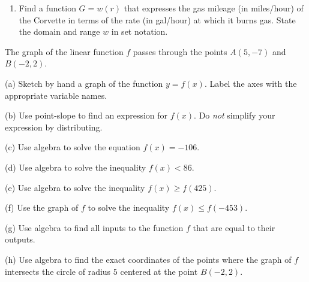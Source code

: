 \documentclass{ximera}
\begin{document}
\begin{question}
\begin{enumerate}
\begin{onlineOnly}
    \begin{center}
\end{center}
\end{onlineOnly}

\href{https://www.desmos.com/calculator/2fq4txcouq}{141: Corvette}

\item Find a function $G=w(r)$ that expresses the gas mileage (in miles/hour) of the Corvette in terms of the rate (in gal/hour) at which it burns gas. State the domain and range $w$ in set notation.

\end{enumerate}
\end{question}


\begin{question}  \label{Qdfg54t54t}
The graph of the linear function $f$ passes through the points $A(5,-7)$ and $B(-2,2)$.

(a) Sketch by hand a graph of the function $y=f(x)$. Label the axes with the appropriate variable names.

(b) Use point-slope to find an expression for $f(x)$. Do \emph{not} simplify your expression by distributing.

(c) Use algebra to solve the equation $f(x) = -106$.

(d) Use algebra to solve the inequality $f(x) < 86$.

(e) Use algebra to solve the inequality $f(x) \geq f(425)$.

(f) Use the graph of $f$ to solve the inequality $f(x)\leq f(-453)$.

(g) Use algebra to find all inputs to the function $f$ that are equal to their outputs.

(h) Use algebra to find the exact coordinates of the points where the graph of $f$ intersects the circle of radius $5$ centered at the point $B(-2,2)$.

\end{question}
\end{document}
